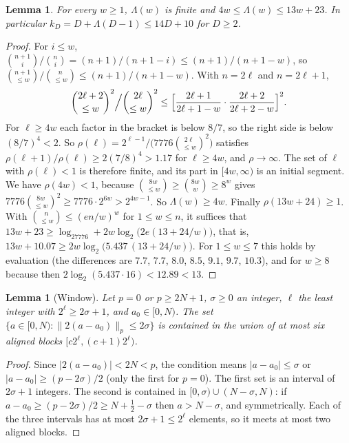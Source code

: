 \documentclass[11pt]{article}
\newtheorem{lemma}[theorem]{Lemma}
\theoremstyle{definition}\newtheorem{definition}[theorem]{Definition}
\theoremstyle{remark}\newtheorem{remark}[theorem]{Remark}
\begin{document}
\begin{lemma}\label{lem:lambda}
For every $w\ge1$, $\Lambda(w)$ is finite and $4w\le\Lambda(w)\le13w+23$.
In particular $k_D=D+\Lambda(D-1)\le14D+10$ for $D\ge2$.
\end{lemma}
\begin{proof}
For $i\le w$, $\binom{n+1}i/\binom ni=(n+1)/(n+1-i)\le(n+1)/(n+1-w)$, so
$\binom{n+1}{\le w}/\binom n{\le w}\le(n+1)/(n+1-w)$. With $n=2\ell$ and
$n=2\ell+1$,
\[
 \binom{2\ell+2}{\le w}^2\Big/\binom{2\ell}{\le w}^2\le
 \Bigl[\frac{2\ell+1}{2\ell+1-w}\cdot\frac{2\ell+2}{2\ell+2-w}\Bigr]^2 .
\]
For $\ell\ge4w$ each factor in the bracket is below $8/7$, so the right
side is below $(8/7)^4<2$. So
$\rho(\ell)=2^{\ell-1}/\bigl(7776\binom{2\ell}{\le w}^2\bigr)$ satisfies
$\rho(\ell+1)/\rho(\ell)\ge2(7/8)^4>1.17$ for $\ell\ge4w$, and
$\rho\to\infty$. The set of $\ell$ with $\rho(\ell)<1$ is therefore
finite, and its part in $[4w,\infty)$ is an initial segment. We have
$\rho(4w)<1$, because $\binom{8w}{\le w}\ge\binom{8w}w\ge8^w$ gives
$7776\binom{8w}{\le w}^2\ge7776\cdot2^{6w}>2^{4w-1}$. So
$\Lambda(w)\ge4w$. Finally $\rho(13w+24)\ge1$. With
$\binom n{\le w}\le(en/w)^w$ for $1\le w\le n$, it suffices that
$13w+23\ge\log_27776+2w\log_2\bigl(2e(13+24/w)\bigr)$, that is,
$13w+10.07\ge2w\log_2\bigl(5.437\,(13+24/w)\bigr)$. For $1\le w\le7$ this
holds by evaluation (the differences are $7.7$, $7.7$, $8.0$, $8.5$,
$9.1$, $9.7$, $10.3$), and for $w\ge8$ because then
$2\log_2(5.437\cdot16)<12.89<13$.
\end{proof}

\begin{lemma}[Window]\label{lem:window}
Let $p=0$ or $p\ge2N+1$, $\sigma\ge0$ an integer, $\ell$ the least
integer with $2^\ell\ge2\sigma+1$, and $a_0\in[0,N)$. The set
$\{a\in[0,N):\|2(a-a_0)\|_p\le2\sigma\}$ is contained in the union of at
most six aligned blocks $[c2^\ell,(c+1)2^\ell)$.
\end{lemma}
\begin{proof}
Since $|2(a-a_0)|<2N<p$, the condition means $|a-a_0|\le\sigma$ or
$|a-a_0|\ge(p-2\sigma)/2$ (only the first for $p=0$). The first set is an
interval of $2\sigma+1$ integers. The second is contained in
$[0,\sigma)\cup(N-\sigma,N)$: if $a-a_0\ge(p-2\sigma)/2\ge N+\frac12-\sigma$
then $a>N-\sigma$, and symmetrically. Each of the three intervals has at
most $2\sigma+1\le2^\ell$ elements, so it meets at most two aligned
blocks.
\end{proof}
\end{document}
